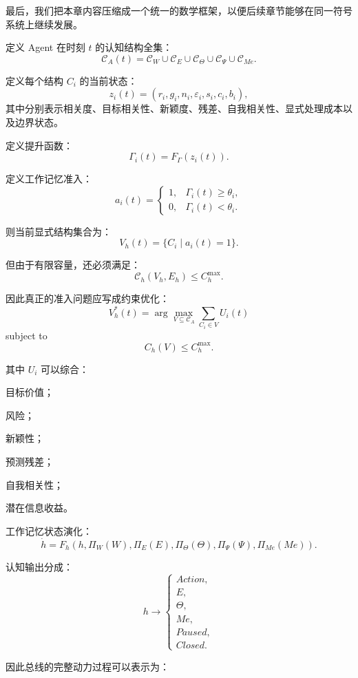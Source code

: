 最后，我们把本章内容压缩成一个统一的数学框架，以便后续章节能够在同一符号系统上继续发展。

定义 Agent 在时刻 $t$ 的认知结构全集：
\[
\mathcal C_A(t)
=
\mathcal C_W
\cup
\mathcal C_E
\cup
\mathcal C_\Theta
\cup
\mathcal C_\Psi
\cup
\mathcal C_{Me}.
\]

定义每个结构 $C_i$ 的当前状态：
\[
z_i(t)
=
\left(
r_i,
g_i,
n_i,
\varepsilon_i,
s_i,
c_i,
b_i
\right),
\]
其中分别表示相关度、目标相关性、新颖度、残差、自我相关性、显式处理成本以及边界状态。

定义提升函数：
\[
\Gamma_i(t)
=
F_\Gamma(z_i(t)).
\]

定义工作记忆准入：
\[
a_i(t)
=
\begin{cases}
1,&\Gamma_i(t)\geq\theta_i,\\
0,&\Gamma_i(t)<\theta_i.
\end{cases}
\]

则当前显式结构集合为：
\[
V_h(t)
=
\{C_i\mid a_i(t)=1\}.
\]

但由于有限容量，还必须满足：
\[
\mathcal C_h
\left(
V_h,E_h
\right)
\leq
C_h^{\max}.
\]

因此真正的准入问题应写成约束优化：
\[
V_h^*(t)
=
\arg\max_{V\subseteq\mathcal C_A}
\sum_{C_i\in V}
U_i(t)
\]
subject to
\[
C_h(V)\leq C_h^{\max}.
\]

其中 $U_i$ 可以综合：

目标价值；

风险；

新颖性；

预测残差；

自我相关性；

潜在信息收益。

工作记忆状态演化：
\[
\dot h
=
F_h
\left(
h,
\Pi_W(W),
\Pi_E(E),
\Pi_\Theta(\Theta),
\Pi_\Psi(\Psi),
\Pi_{Me}(Me)
\right).
\]

认知输出分成：
\[
h
\rightarrow
\begin{cases}
Action,\\
E,\\
\Theta,\\
Me,\\
Paused,\\
Closed.
\end{cases}
\]

因此总线的完整动力过程可以表示为：
\begin{statementbox}
\centering
{}
\end{statementbox}

